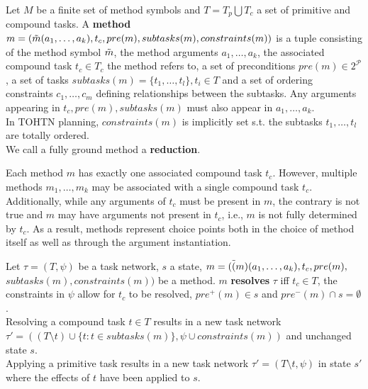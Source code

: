 \begin{definition} %
	Let $M$ be a finite set of method symbols and $T = T_p \bigcup T_c$ a set of primitive and compound tasks. A \textbf{method} $m = (\Tilde{m}(a_1, \ldots, a_k), t_c, pre(m), subtasks(m), constraints(m))$ is a tuple consisting of the method symbol $\Tilde{m}$, the method arguments $a_1, \ldots, a_k$, the associated compound task $t_c \in T_c$ the method refers to, a set of preconditions $pre(m) \in 2^{\mathcal{P}}$, a set of tasks $subtasks(m) = \{t_1, \ldots, t_l\}, t_i \in T$ and a set of ordering constraints $c_1, \ldots, c_m$ defining relationships between the subtasks. Any arguments appearing in $t_c, pre(m), subtasks(m)$ must also appear in $a_1, \ldots, a_k$.\\
	In TOHTN planning, $constraints(m)$ is implicitly set s.t. the subtasks $t_1, \ldots, t_l$ are totally ordered. \\
	We call a fully ground method a \textbf{reduction}.
\end{definition}
Each method $m$ has exactly one associated compound task $t_c$. However, multiple methods $m_1, \ldots, m_k$ may be associated with a single compound task $t_c$. Additionally, while any arguments of $t_c$ must be present in $m$, the contrary is not true and $m$ may have arguments not present in $t_c$, i.e., $m$ is not fully determined by $t_c$. As a result, methods represent choice points both in the choice of method itself as well as through the argument instantiation. \\


\begin{definition} %
	Let $\tau = (T, \psi)$ be a task network, $s$ a state, $m = (\Tilde(m)(a_1, \ldots, a_k), t_c, pre(m),$\\$ subtasks(m), constraints(m))$ be a method. $m$ \textbf{resolves} $\tau$ iff $t_c \in T$, the constraints in $\psi$ allow for $t_c$ to be resolved, $pre^+(m) \in s$ and $pre^-(m) \cap s = \emptyset$. \\
	Resolving a compound task $t \in T$ results in a new task network $\tau' = ((T \setminus t) \cup \{t : t \in subtasks(m)\}, \psi \cup constraints(m))$ and unchanged state $s$. \\
	Applying a primitive task results in a new task network $\tau' = (T \setminus t, \psi)$ in state $s'$ where the effects of $t$ have been applied to $s$. 
\end{definition}

